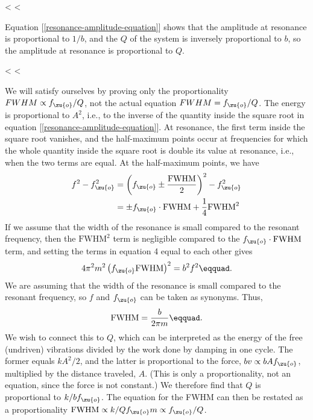 <%
<%

Equation [\ref{resonance-amplitude-equation}] shows that the amplitude at resonance is
proportional to $1/b$, and the $Q$ of the system is
inversely proportional to $b$, so the amplitude at resonance
is proportional to $Q$.

<%
<%

We will satisfy ourselves by proving only the proportionality
$FWHM\propto f_\zu{o}/Q$, not the actual equation $FWHM=f_\zu{o}/Q$.
The energy is proportional to $A^2$, i.e., to the inverse of
the quantity inside the square root in equation [\ref{resonance-amplitude-equation}]. At
resonance, the first term inside the square root vanishes,
and the half-maximum points occur at frequencies for which
the whole quantity inside the square root is double its
value at resonance, i.e., when the two terms are equal. At
the half-maximum points, we have
\begin{align*}
  f^2-f_\zu{o}^2 &= \left(f_\zu{o} \pm \frac{\text{FWHM}}{2}\right)^2 - f_\zu{o}^2\\
                &= \pm f_\zu{o}\cdot \text{FWHM} + \frac{1}{4}\text{FWHM}^2
\end{align*}
If we assume that the width of the resonance is small
compared to the resonant frequency, then the $\text{FWHM}^2$ term 
is negligible compared to the $f_\zu{o}\cdot \text{FWHM}$ term, and setting
the terms in equation 4 equal to each other gives
\begin{equation*}
  4\pi^2m^2\left(f_\zu{o}\text{FWHM}\right)^2  = b^2f^2\eqquad.
\end{equation*}
We are assuming that the width of the resonance is small
compared to the resonant frequency, so $f$ and $f_\zu{o}$ can
be taken as synonyms. Thus,
\begin{equation*}
                        \text{FWHM}  = \frac{b}{2\pi m}\eqquad.
\end{equation*}
We wish to connect this to $Q$, which can be interpreted as
the energy of the free (undriven) vibrations divided by the
work done by damping in one cycle. The former equals
$kA^2/2$, and the latter is proportional to the force,
$bv\propto bAf_\zu{o}$, multiplied by the distance traveled,
$A$. (This is only a proportionality, not an equation, since
the force is not constant.) We therefore find that $Q$ is
proportional to $k/bf_\zu{o}$. The equation for the FWHM can
then be restated as a proportionality $\text{FWHM}\propto k/Qf_\zu{o}m\propto f_\zu{o}/Q$.


